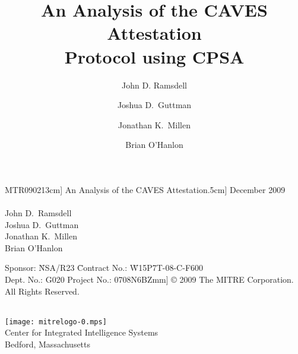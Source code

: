 \documentclass[titlepage,12pt]{article}
\title{An Analysis of the CAVES Attestation\\ Protocol using CPSA}
\author{John D. Ramsdell\and Joshua D.~Guttman\and Jonathan K.~Millen\and
Brian O'Hanlon}
\theoremstyle{definition}
\begin{document}
\iffalse
\maketitle
\else








\begin{titlepage}
\begin{trivlist}\sffamily\bfseries\large
\item
MTR090213\1cm]
\LARGE
An Analysis of the CAVES Attestation\2.5cm]
\large
December 2009\\
~\\
\mdseries
John D.~Ramsdell\\
Joshua D.~Guttman\\
Jonathan K.~Millen\\
Brian O'Hanlon \\
\vfill
\normalsize
\bfseries
\begingroup\footnotesize
\begin{tabbing}
Sponsor: \phantom{spo} \= NSA/R23 \phantom{phantom} \=
Contract No.: \phantom{pro}\= W15P7T-08-C-F600 \\
Dept. No.: \>G020 \>Project No.: \>0708N6BZ\4mm]
{\copyright} 2009 The MITRE Corporation. All Rights Reserved.
\end{tabbing}
\endgroup
~\\
\noindent
\texttt{[image: mitrelogo-0.mps]}\\
Center for Integrated Intelligence Systems\\
Bedford, Massachusetts
\end{trivlist}
\end{titlepage}
\end{document}

